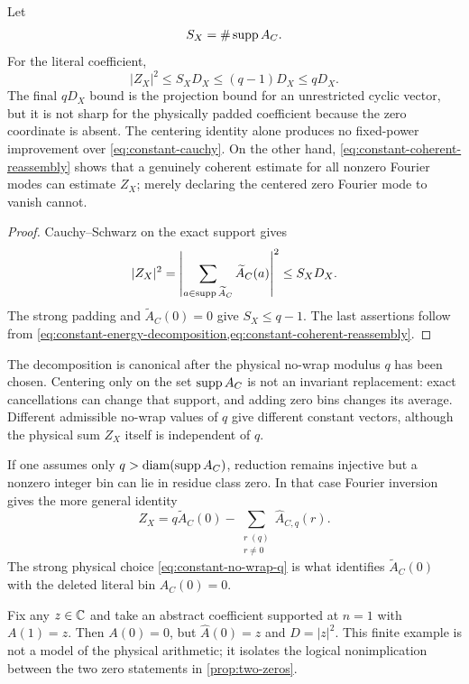\begin{corollary}
\label{cor:centering-no-cancellation}
Let
\[
 S_X=\#\operatorname{supp} A_C.
\]
For the literal coefficient,
\begin{equation}
 \boxed{
 |Z_X|^2\le S_XD_X\le(q-1)D_X\le qD_X.}
 \label{eq:constant-cauchy}
\end{equation}
The final \(qD_X\) bound is the projection bound for an unrestricted
cyclic vector, but it is not sharp for the physically padded
coefficient because the zero coordinate is absent.  The centering
identity alone produces no fixed-power improvement over
\eqref{eq:constant-cauchy}.  On the other hand,
\eqref{eq:constant-coherent-reassembly} shows that a genuinely
coherent estimate for all nonzero Fourier modes can estimate \(Z_X\);
merely declaring the centered zero Fourier mode to vanish cannot.
\end{corollary}

\begin{proof}
Cauchy--Schwarz on the exact support gives
\[
 |Z_X|^2
 =\left|\sum_{a\in\operatorname{supp}\widetilde A_C}
            \widetilde A_C(a)\right|^2
 \le S_XD_X.
\]
The strong padding and \(\widetilde A_C(0)=0\) give
\(S_X\le q-1\).  The last assertions follow from
\cref{eq:constant-energy-decomposition,eq:constant-coherent-reassembly}.
\end{proof}

\begin{remark}
The decomposition is canonical after the physical no-wrap modulus
\(q\) has
been chosen.  Centering only on the set
\(\operatorname{supp} A_C\) is not an invariant replacement: exact cancellations
can change that support, and adding zero bins changes its average.
Different admissible no-wrap values of \(q\) give different constant
vectors, although the physical sum \(Z_X\) itself is independent of
\(q\).
\end{remark}

\begin{remark}
If one assumes only
\(q>\operatorname{diam}(\operatorname{supp} A_C)\), reduction remains injective but a nonzero
integer bin can lie in residue class zero.  In that case Fourier
inversion gives the more general identity
\[
 Z_X=q\widetilde A_C(0)
 -\sum_{\substack{r\; (q)\\r\ne0}}\widehat A_{C,q}(r).
\]
The strong physical choice \eqref{eq:constant-no-wrap-q} is what
identifies \(\widetilde A_C(0)\) with the deleted literal bin
\(A_C(0)=0\).
\end{remark}

\begin{example}[Deleting the bin \(n=0\) is not centering]
Fix any \(z\in\mathbb C\) and take an abstract coefficient supported at
\(n=1\) with \(A(1)=z\).  Then \(A(0)=0\), but
\(\widehat A(0)=z\) and \(D=|z|^2\).  This finite example is not a
model of the physical arithmetic; it isolates the logical
nonimplication between the two zero statements in
\cref{prop:two-zeros}.
\end{example}
